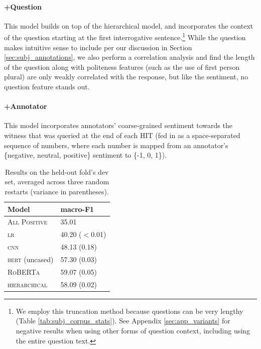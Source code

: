 \paragraph{+Question} This model builds on top of the hierarchical model, and incorporates the context of the question starting at the first interrogative sentence.\footnote{We employ this truncation method because questions can be very lengthy (Table \ref{tab:subj_corpus_stats}). See Appendix \ref{sec:app_variants} for negative results when using other forms of question context, including using the entire question text.} While the question makes intuitive sense to include per our discussion in Section \ref{sec:subj_annotations}, we also perform a correlation analysis and find the length of the question along with politeness features (such as the use of first person plural) are only weakly correlated with the response, but like the sentiment, no question feature stands out.

\paragraph{+Annotator} This model incorporates annotators' coarse-grained sentiment towards the witness that was queried at the end of each HIT (fed in as a space-separated sequence of numbers, where each number is mapped from an annotator's \{negative, neutral, positive\} sentiment to \{-1, 0, 1\}). 


\begin{table}
\centering
\small
\begin{tabular}{ll}
\toprule
Model  &macro-F1\\ 
\midrule
\textsc{All Positive} &35.01 \\
\textsc{lr} &40.20 ($<$0.01) \\
\textsc{cnn} &48.13 (0.18)\\
\midrule
\textsc{bert} (uncased) &57.30 (0.03)\\
\textsc{RoBERTa} &59.07 (0.05)\\
\textsc{hierarchical} &58.09 (0.02)\\
\bottomrule
\end{tabular}
\vspace{-.3em}
\caption{Results on the held-out fold's dev set, averaged across three random restarts (variance in parentheses).}
\label{tab:subj_base_results}
\end{table}

